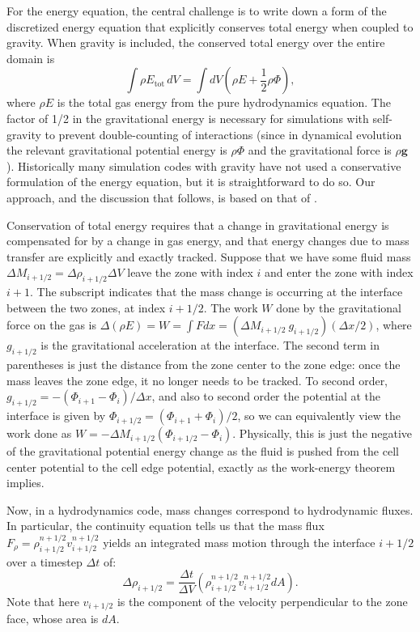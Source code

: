 \documentclass[12pt]{article}
\begin{document}
For the energy equation, the central challenge is to write down a form of the 
discretized energy equation that explicitly conserves total energy when 
coupled to gravity. When gravity is included, the conserved total energy
over the entire domain is
\begin{equation}
  \int \rho E_{\text{tot}}\, dV = \int dV \left(\rho E + \frac{1}{2}\rho\Phi\right), \label{eq:total_energy_gravity}
\end{equation}
where $\rho E$ is the total gas energy from the pure hydrodynamics equation. 
The factor of 1/2 in the gravitational energy is necessary for simulations with
self-gravity to prevent double-counting of interactions (since in dynamical evolution
the relevant gravitational potential energy is $\rho \Phi$ and the gravitational force
is $\rho \mathbf{g}$). Historically many simulation codes with gravity have not used
a conservative formulation of the energy equation, but it is straightforward to do so.
Our approach, and the discussion that follows, is based on that of \cite{arepo}.

Conservation of total energy requires that a change in gravitational energy is compensated
for by a change in gas energy, and that energy changes due to mass transfer are explicitly and 
exactly tracked. Suppose that we have some fluid mass $\Delta M_{i+1/2} = \Delta \rho_{i+1/2} \Delta V$ leave the zone
with index $i$ and enter the zone with index $i+1$. The subscript indicates that the mass change is
occurring at the interface between the two zones, at index $i+1/2$. The work $W$ done by the gravitational
force on the gas is $\Delta (\rho E) = W = \int F dx = (\Delta M_{i+1/2}\ g_{i+1/2}) (\Delta x / 2)$,
where $g_{i+1/2}$ is the gravitational acceleration at the interface. The second term in parentheses
is just the distance from the zone center to the zone edge: once the mass leaves the zone edge, it no longer
needs to be tracked. To second order, $g_{i+1/2} = -(\Phi_{i+1} - \Phi_{i}) / \Delta x$, and also to second order the potential
at the interface is given by $\Phi_{i+1/2} = (\Phi_{i+1} + \Phi_i) / 2$, so we can equivalently view the work done
as $W = -\Delta M_{i+1/2} (\Phi_{i+1/2} - \Phi_i)$. Physically, this is just the negative of the gravitational
potential energy change as the fluid is pushed from the cell center potential to the cell edge potential,
exactly as the work-energy theorem implies. 

Now, in a hydrodynamics code, mass changes correspond to hydrodynamic fluxes. In particular,
the continuity equation tells us that the mass flux $F_\rho = \rho^{n+1/2}_{i+1/2} v^{n+1/2}_{i+1/2}$ yields
an integrated mass motion through the interface $i+1/2$ over a timestep $\Delta t$ of:
\begin{equation}
  \Delta \rho_{i+1/2} = \frac{\Delta t}{\Delta V} \left(\rho^{n+1/2}_{i+1/2} v^{n+1/2}_{i+1/2} dA\right).
\end{equation}
Note that here $v_{i+1/2}$ is the component of the velocity perpendicular to the zone face, whose
area is $dA$.
\end{document}
